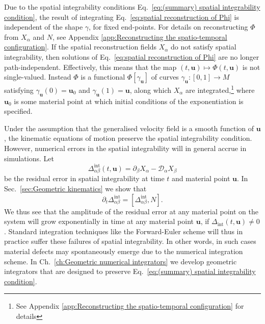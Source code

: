  Due to the spatial integrability conditions Eq.~\ref{eq:(summary) spatial integrability condition}, the result of integrating Eq.~\ref{eq:spatial reconstruction of Phi} is independent of the shape $\gamma$, for fixed end-points. For details on reconstructing $\Phi$ from $X_\alpha$ and $N$, see Appendix \ref{app:Reconstructing the spatio-temporal configuration}. If the spatial reconstruction fields $X_\alpha$ do not satisfy spatial integrability, then solutions of Eq.~\ref{eq:spatial reconstruction of Phi} are no longer path-independent. Effectively, this means that the map $(t, \mathbf{u}) \mapsto \Phi(t, \mathbf{u})$ is not single-valued. Instead $\Phi$ is a functional $\Phi[\gamma_\mathbf{u}]$ of curves $\gamma_\mathbf{u} : [0,1] \to M$ satisfying $\gamma_\mathbf{u}(0) = \mathbf{u}_0$ and $\gamma_\mathbf{u}(1) = \mathbf{u}$, along which $X_\alpha$ are integrated,\footnote{See Appendix \ref{app:Reconstructing the spatio-temporal configuration} for details} where $\mathbf{u}_0$ is some material point at which initial conditions of the exponentiation is specified.

Under the assumption that the generalised velocity field is a smooth function of $\mathbf{u}$, the kinematic equations of motion preserve the spatial integrability condition. However, numerical errors in the spatial integrability will in general accrue in simulations. Let
\begin{equation} \label{eq:spatial integrability residual}
	\Delta^\text{int}_{\alpha \beta}(t, \mathbf{u}) = \partial_\beta X_\alpha - \mathcal{D}_\alpha X_\beta
\end{equation}
be the residual error in spatial integrability at time $t$ and material point $\mathbf{u}$. In Sec.~\ref{sec:Geometric kinematics} we show that 
\begin{equation} \label{eq:(summary) time derivative of spatial integrability conditions}
\partial_t \Delta^\text{int}_{\alpha \beta} = [ \Delta^\text{int}_{\alpha \beta}, N].
\end{equation}
We thus see that the amplitude of the residual error at any material point on the system will grow exponentially in time at any material point $\mathbf{u}$, if $\Delta_\text{int}(t,\mathbf{u}) \neq 0$. Standard integration techniques like the Forward-Euler scheme will thus in practice suffer these failures of spatial integrability. In other words, in such cases material defects may spontaneously emerge due to the numerical integration scheme. In Ch.~\ref{ch:Geometric numerical integrators} we develop geometric integrators that are designed to preserve Eq.~\ref{eq:(summary) spatial integrability condition}. 

